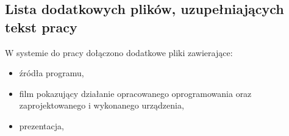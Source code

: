 \documentclass[a4paper,twoside,12pt]{book}
\begin{document}
\begin{appendices}



   \chapter*{Lista dodatkowych plików, uzupełniających tekst pracy}

   W systemie do pracy dołączono dodatkowe pliki zawierające:
   \begin{itemize}
      \item źródła programu,
      \item film pokazujący działanie opracowanego oprogramowania oraz zaprojektowanego i wykonanego urządzenia,
      \item prezentacja,
   \end{itemize}

   \listoffigures

\end{appendices}
\end{document}
